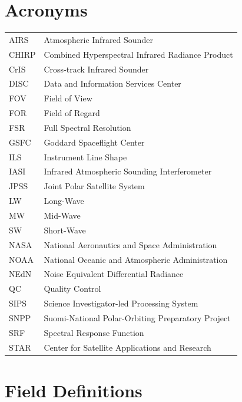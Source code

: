 \documentclass[12pt]{article}
\begin{document}



\appendix
\section{Acronyms}

\begin{center}
\begin{tabular}{ m{2cm} m{10cm} }
AIRS    & Atmospheric Infrared Sounder \\
CHIRP   & Combined Hyperspectral Infrared Radiance Product \\
CrIS    & Cross-track Infrared Sounder \\
DISC    & Data and Information Services Center \\
FOV     & Field of View \\
FOR     & Field of Regard \\
FSR     & Full Spectral Resolution \\
GSFC    & Goddard Spaceflight Center \\
ILS     & Instrument Line Shape \\
IASI    & Infrared Atmospheric Sounding Interferometer \\
JPSS    & Joint Polar Satellite System \\
LW      & Long-Wave \\
MW      & Mid-Wave \\
SW      & Short-Wave \\
NASA    & National Aeronautics and Space Administration \\
NOAA    & National Oceanic and Atmospheric Administration \\
NEdN    & Noise Equivalent Differential Radiance \\
QC      & Quality Control \\
SIPS    & Science Investigator-led Processing System \\
SNPP    & Suomi-National Polar-Orbiting Preparatory Project \\
SRF     & Spectral Response Function \\
STAR    & Center for Satellite Applications and Research \\
\end{tabular}
\end{center}

\section{Field Definitions}


{\scriptsize



}
\end{document}
